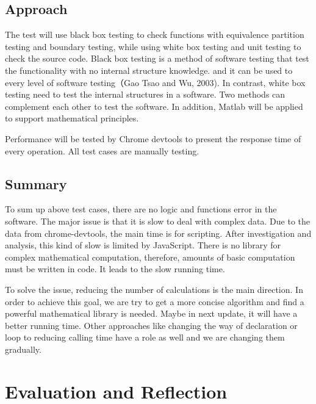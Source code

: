 \documentclass[11pt,oneside,a4paper]{article}
\begin{document}
\subsection{Approach}
The test will use black box testing to check functions with equivalence partition testing and boundary testing, while using white box testing and unit testing to check the source code. Black box testing is a method of software testing that test the functionality with no internal structure knowledge. and it can be used to every level of software testing（Gao Tsao and Wu, 2003). In contrast, white box testing need to test the internal structures in a software. Two methods can complement each other to test the software. In addition, Matlab will be applied to support mathematical principles. 

Performance will be tested by Chrome devtools to present the response time of every operation. All test cases are manually testing.

\subsection{Summary}
To sum up above test cases, there are no logic and functions error in the software. The major issue is that it is slow to deal with complex data. Due to the data from chrome-devtools, the main time is for scripting. After investigation and analysis, this kind of slow is limited by JavaScript. There is no library for complex mathematical computation, therefore, amounts of basic computation must be written in code. It leads to the slow running time.

To solve the issue, reducing the number of calculations is the main direction. In order to achieve this goal, we are try to get a more concise algorithm and find a powerful mathematical library is needed. Maybe in next update, it will have a better running time. Other approaches like changing the way of declaration or loop to reducing calling time have a role as well and we are changing them gradually.





\section{Evaluation and Reflection}
\end{document}
